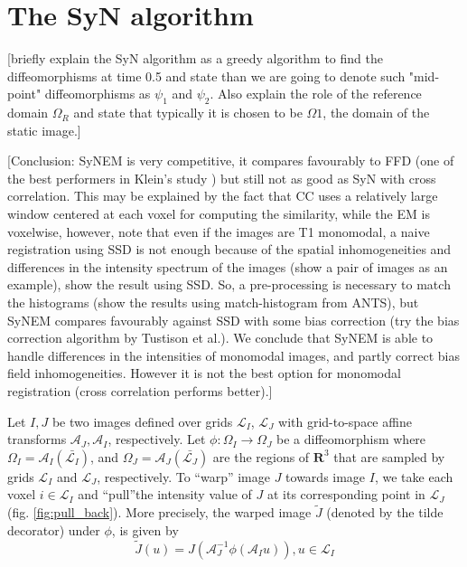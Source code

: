 \section{The SyN algorithm}
[briefly explain the SyN algorithm as a greedy algorithm to find the diffeomorphisms at time 0.5 and state than we are going to denote such "mid-point" diffeomorphisms as $\psi_{1}$ and $\psi_{2}$. Also explain the role of the reference domain $\Omega_R$ and state that typically it is chosen to be $\Omega{1}$, the domain of the static image.]


[Conclusion: SyNEM is very competitive, it compares favourably to FFD (one of the best performers in Klein's study \cite{Klein2009}) but still not as good as SyN with cross
correlation. This may be explained by the fact that CC uses a relatively large window centered at each voxel for computing the similarity, while the EM is voxelwise, however, note that even if the images are T1 monomodal, a naive registration using SSD is not enough because of the spatial inhomogeneities and differences in the intensity spectrum of the images (show a pair of images as an example), show the result using SSD. So, a pre-processing is necessary to match the histograms (show the results using match-histogram from ANTS), but SyNEM compares favourably against SSD with some bias correction (try the bias correction algorithm by Tustison et al.). We conclude that SyNEM is able to handle differences in the intensities of monomodal images, and partly correct bias field inhomogeneities. However it is not the best option for monomodal registration (cross correlation performs better).]




Let $I, J$ be two images defined over grids $\mathcal{L}_{I}$, $\mathcal{L}_{J}$ with grid-to-space affine transforms $\mathcal{A}_{J}, \mathcal{A}_{I}$, respectively. Let
$\phi:\Omega_{I} \rightarrow \Omega_{J}$ be a diffeomorphism where $\Omega_{I} = \mathcal{A}_{I}(\bar{\mathcal{L}_{I}})$,
and $\Omega_{J} = \mathcal{A}_{J}(\bar{\mathcal{L}_{J}})$ are the regions of $\mathbf{R}^{3}$ that are sampled by grids $\mathcal{L}_{I}$ and $\mathcal{L}_{J}$, respectively.
To ``warp'' image $J$ towards image $I$, we take each voxel $i \in \mathcal{L}_{I}$ and ``pull''the intensity value of $J$ at its corresponding point in $\mathcal{L}_{J}$
(fig. \ref{fig:pull_back}). More precisely, the warped image $\tilde{J}$ (denoted by the tilde decorator) under $\phi$, is given by
\begin{equation}\label{eq:warp_definition}
    \tilde{J}(u) = J(\mathcal{A}_{J}^{-1}\phi(\mathcal{A}_{I}u)), u \in \mathcal{L}_{I}
\end{equation}

